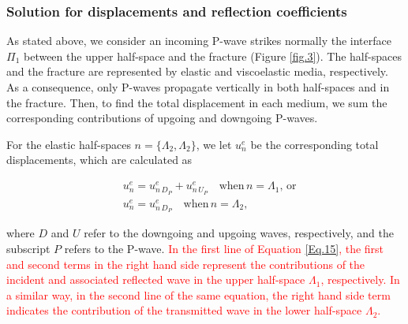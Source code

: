 \documentclass[draft]{agujournal2019}
\newcommand{\red}{\textcolor{red}}
\begin{document}
\subsubsection{Solution for displacements and reflection coefficients}
As stated above, we consider an incoming P-wave strikes normally the interface $\Pi_1$  between the upper half-space and the fracture (Figure \ref{fig.3}). The half-spaces and the fracture are represented by elastic and viscoelastic media, respectively. As a consequence, only P-waves propagate vertically in both half-spaces and in the fracture. Then, to find the total displacement in each medium, we sum the corresponding contributions of upgoing and downgoing P-waves.

For the elastic half-spaces $n =\{\Lambda_2, \Lambda_2\}$, we let $u_n^e$ be the corresponding total displacements, which are calculated as
\begin{linenomath*}
\begin{equation}\label{Eq.15}
\begin{split}
& u_n^e=  u_{n\,{D_P}}^e + u_{n\,{U_P}}^e \quad \text{when}\, n=\Lambda_1 , \, \text{or}  \\
& u_n^e = u_{n\,{D_P}}^e \quad \text{when}\, n=\Lambda_2 ,
\end{split}
\end{equation}
\end{linenomath*}
where $D$ and $U$ refer to the downgoing and upgoing waves, respectively, and the subscript $P$ refers to the P-wave. \red{
In the first line of Equation \eqref{Eq.15}, the first and second terms in the right hand side represent the contributions of the incident and associated reflected wave in the upper half-space $\Lambda_1$, respectively. In a similar way, in the second line of the same equation, the right hand side term indicates the contribution of the transmitted wave in the lower half-space $\Lambda_2$.
}
\end{document}
